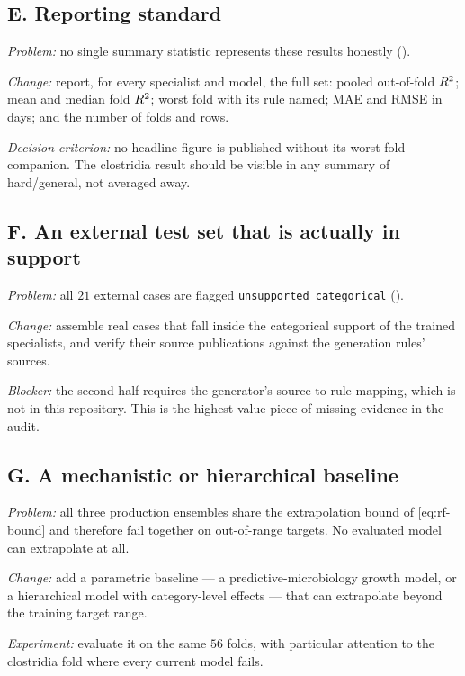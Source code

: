 \subsection{E. Reporting standard}

\emph{Problem:} no single summary statistic represents these results
honestly ().

\emph{Change:} report, for every specialist and model, the full set:
pooled out-of-fold $R^2$; mean and median fold $R^2$; worst fold with its
rule named; MAE and RMSE in days; and the number of folds and rows.

\emph{Decision criterion:} no headline figure is published without its
worst-fold companion. The clostridia result should be visible in any
summary of hard/general, not averaged away.

\subsection{F. An external test set that is actually in support}

\emph{Problem:} all $21$ external cases are flagged
\texttt{unsupported\_categorical} ().

\emph{Change:} assemble real cases that fall inside the categorical support
of the trained specialists, and verify their source publications against
the generation rules' sources.

\emph{Blocker:} the second half requires the generator's source-to-rule
mapping, which is not in this repository. This is the highest-value piece
of missing evidence in the audit.

\subsection{G. A mechanistic or hierarchical baseline}

\emph{Problem:} all three production ensembles share the extrapolation
bound of \cref{eq:rf-bound} and therefore fail together on out-of-range
targets. No evaluated model can extrapolate at all.

\emph{Change:} add a parametric baseline --- a predictive-microbiology
growth model, or a hierarchical model with category-level effects --- that
can extrapolate beyond the training target range.

\emph{Experiment:} evaluate it on the same $56$ folds, with particular
attention to the clostridia fold where every current model fails.

